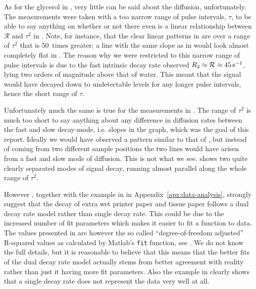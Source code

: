 \documentclass[11pt,a4paper, twocolumn,
swedish, english %
]{article}
\begin{document}
As for the glycerol in , very little can be said
about the diffusion, unfortunately. The measurements were taken with a
too narrow range of pulse intervals, $\tau$, to be able to say 
anything on whether or not there even is a linear relationship
between $\mathcal{R}$ and $\tau^2$ in . Note, for
instance, that the clear linear patterns in  are
over a range of $\tau^2$ that is 50~times greater; a line with the
same slope as in  would look almost completely
flat in . The reason why we were restricted to this
narrow range of pulse intervals is due to the fast intrinsic decay rate
observed $R_2\approx\mathcal{R}\approx\unit[45]{s^{-1}}$, lying two
orders of magnitude above that of water. This meant that the signal
would have decayed down to undetectable levels for any longer pulse
intervals, hence the short range of $\tau$.

Unfortunately much the same is true for the measurements in
. The range of $\tau^2$ is much too short to say
anything about any difference in diffusion rates between the fast and
slow decay-mode, i.e. slopes in the graph, which was the goal of this
report. Ideally we would have observed a pattern similar to that of
, but instead of coming from two different
sample positions the two lines would have arisen from a fast and slow
mode of diffusion. This is not what we see. 
shows two quite clearly separated modes of signal decay, running
almost parallel along the whole range of $\tau^2$.

However , together with the example in
 in Appendix~\ref{apx:data-analysis},
strongly\footnotemark{} suggest that the decay of extra wet printer
paper and tissue paper follows a dual decay rate model rather than
single decay rate. This could be due to the increased number of fit
parameters which makes it easier to fit a function to data. The values
presented in  are however the so called
``degree-of-freedom adjusted'' R-squared values as calculated by
Matlab's \texttt{fit} function, see \cite{Matlab-fit}. We do not know the
full details, but it is reasonable to believe that this means that the
better fits of the dual decay rate model actually stems from better
agreement with reality rather than just it having more fit
parameters. Also the example in  clearly
shows that a single decay rate does not represent the data very well
at all.
\end{document}
